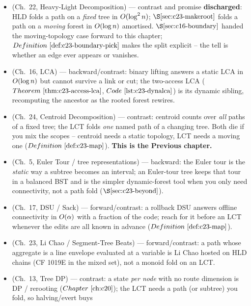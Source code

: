 
\begin{itemize}[nosep, leftmargin=1.4em]
  \item {} (Ch.~22, Heavy-Light Decomposition) --- contrast and promise \textbf{discharged}:
        HLD folds a path on a \emph{fixed} tree in \(O(\log^2 n)\); \(\secref{c23-makeroot}\) folds a
        path on a \emph{moving} forest in \(O(\log n)\) amortised. \(\secref{c16-boundary}\) handed
        the moving-topology case forward to this chapter; \(\defref{c23-boundary-pick}\) makes the split
        explicit -- the tell is whether an edge ever appears or vanishes.
  \item {} (Ch.~16, LCA) --- backward/contrast: binary lifting answers a static LCA in
        \(O(\log n)\) but cannot survive a link or cut; the two-access LCA
        (\(\thmref{c23-access-lca}\), \(\coderef{c23-dynalca}\)) is its dynamic sibling, recomputing the
        ancestor as the rooted forest rewires.
  \item {} (Ch.~24, Centroid Decomposition) --- contrast: centroid counts over \emph{all} paths
        of a fixed tree; the LCT folds \emph{one} named path of a changing tree. Both die if you mix the
        scopes -- centroid needs a static topology, LCT needs a moving one (\(\defref{c23-map}\)).
        \textbf{This is the Previous chapter.}
  \item {} (Ch.~5, Euler Tour / tree representations) --- backward: the Euler tour is the
        \emph{static} way a subtree becomes an interval; an Euler-tour tree keeps that tour in a balanced
        BST and is the simpler dynamic-forest tool when you only need connectivity, not a path fold
        (\(\secref{c23-beyond}\)).
  \item {} (Ch.~17, DSU / Sack) --- forward/contrast: a rollback DSU answers offline
        connectivity in \(O(\alpha)\) with a fraction of the code; reach for it before an LCT whenever
        the edits are all known in advance (\(\defref{c23-map}\)).
  \item {} (Ch.~23, Li Chao / Segment-Tree Beats) --- forward/contrast: a path whose aggregate is
        a line envelope evaluated at a variable is Li Chao hosted on HLD chains (CF 1019E in the mixed
        set), not a monoid fold on an LCT.
  \item {} (Ch.~13, Tree DP) --- contrast: a state \emph{per node} with no route dimension is DP
        / rerooting (\(\chref{c20}\)); the LCT needs a path (or subtree) you fold, so halving/evert buys

\end{itemize}
